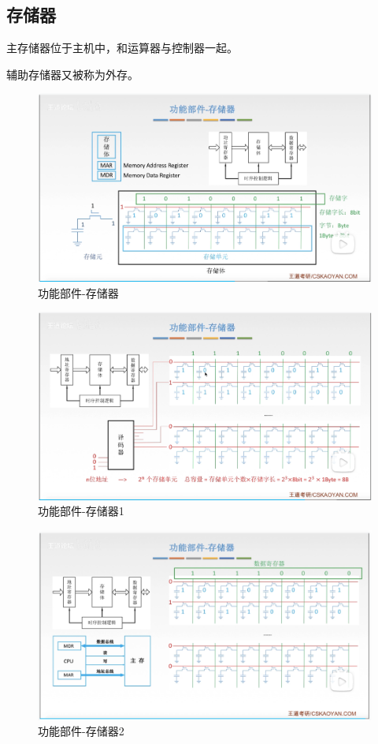 \documentclass[12pt]{ctexart}
\begin{document}
\subsection{存储器}

主存储器位于主机中，和运算器与控制器一起。

辅助存储器又被称为外存。
\begin{figure}[htbp]
    \centering
    \includegraphics[scale=0.6]{存储器.png}
    \caption{功能部件-存储器}
    \end{figure}

\begin{figure}[htbp]
        \centering
        \includegraphics[scale=0.6]{存储器1.png}
        \caption{功能部件-存储器1}
        \end{figure}
\begin{figure}[htbp]
        \centering
        \includegraphics[scale=0.6]{存储器2.png}
        \caption{功能部件-存储器2}
        \end{figure}
\end{document}
